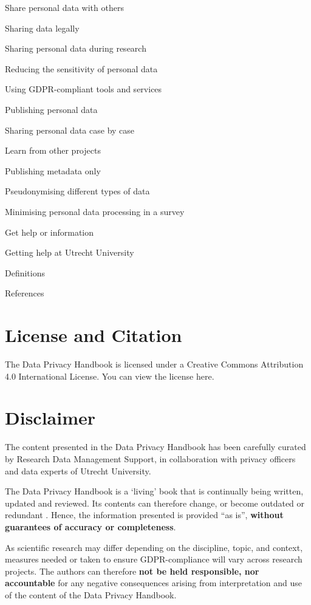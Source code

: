 \documentclass[
]{book}
\begin{document}
Share personal data with others

Sharing data legally

Sharing personal data during research

Reducing the sensitivity of personal data

Using GDPR-compliant tools and services

Publishing personal data

Sharing personal data case by case

Learn from other projects

Publishing metadata only

Pseudonymising different types of data

Minimising personal data processing in a survey

Get help or information

Getting help at Utrecht University

Definitions

References

\hypertarget{license-and-citation}{%
\section{License and Citation}\label{license-and-citation}}

The Data Privacy Handbook is licensed under a Creative Commons Attribution 4.0 International License. You can view the license here.

\hypertarget{disclaimer}{%
\section{Disclaimer}\label{disclaimer}}

The content presented in the Data Privacy Handbook has been carefully curated by Research Data Management Support,
in collaboration with privacy officers and data experts of Utrecht University.

The Data Privacy Handbook is a `living' book that is continually being written, updated and reviewed. Its contents can
therefore change, or become outdated or redundant . Hence, the information presented is provided ``as is'', \textbf{without
guarantees of accuracy or completeness}.

As scientific research may differ depending on the discipline, topic, and context, measures needed or taken to ensure
GDPR-compliance will vary across research projects. The authors can therefore \textbf{not be held responsible, nor accountable}
for any negative consequences arising from interpretation and use of the content of the Data Privacy Handbook.
\end{document}
